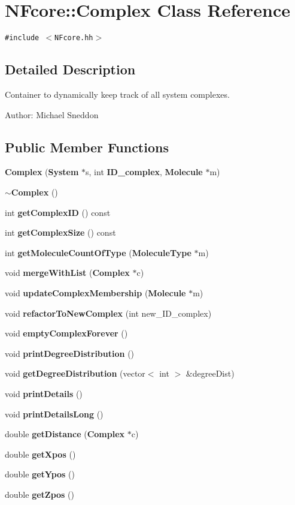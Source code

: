 \section{NFcore::Complex Class Reference}
\label{classNFcore_1_1Complex}
{\tt \#include $<$NFcore.hh$>$}



\subsection{Detailed Description}
Container to dynamically keep track of all system complexes. 

\begin{Desc}
\item[Author:]Michael Sneddon \end{Desc}
\subsection*{Public Member Functions}
\begin{CompactItemize}
\item 
{\bf Complex} ({\bf System} $\ast$s, int {\bf ID\_\-complex}, {\bf Molecule} $\ast$m)
\item 
{\bf $\sim$Complex} ()
\item 
int {\bf getComplexID} () const 
\item 
int {\bf getComplexSize} () const 
\item 
int {\bf getMoleculeCountOfType} ({\bf MoleculeType} $\ast$m)
\item 
void {\bf mergeWithList} ({\bf Complex} $\ast$c)
\item 
void {\bf updateComplexMembership} ({\bf Molecule} $\ast$m)
\item 
void {\bf refactorToNewComplex} (int new\_\-ID\_\-complex)
\item 
void {\bf emptyComplexForever} ()
\item 
void {\bf printDegreeDistribution} ()
\item 
void {\bf getDegreeDistribution} (vector$<$ int $>$ \&degreeDist)
\item 
void {\bf printDetails} ()
\item 
void {\bf printDetailsLong} ()
\item 
double {\bf getDistance} ({\bf Complex} $\ast$c)
\item 
double {\bf getXpos} ()
\item 
double {\bf getYpos} ()
\item 
double {\bf getZpos} ()
\end{CompactItemize}

